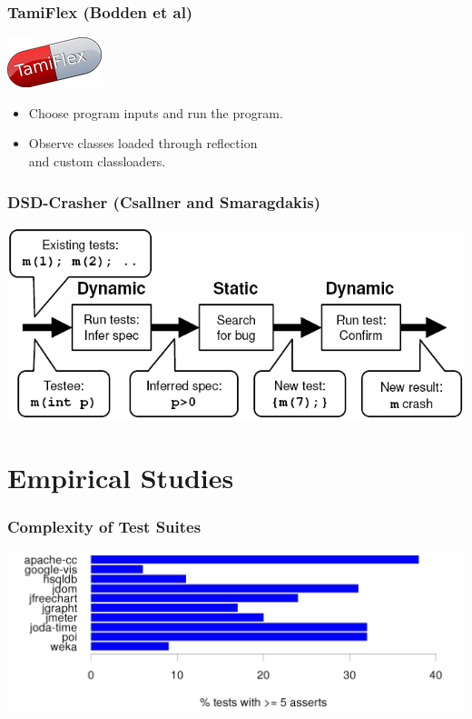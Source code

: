 \documentclass{beamer}
\newenvironment{changemargin}[1]{%
  \begin{list}{}{%
    \setlength{\topsep}{0pt}%
    \setlength{\leftmargin}{#1}%
    \setlength{\rightmargin}{1em}
    \setlength{\listparindent}{\parindent}%
    \setlength{\itemindent}{\parindent}%
    \setlength{\parsep}{\parskip}%
  }%
  \item[]}{\end{list}}
\begin{document}
\begin{frame}
  \frametitle{TamiFlex (Bodden et al)}

\begin{center}
\includegraphics[width=.2\textwidth]{images/tamiflex.png}
\end{center}

\Large
\begin{changemargin}{1cm}
\begin{itemize}
\item Choose program inputs and run the program.
\item Observe classes loaded through reflection \\
 \hspace*{2em} and custom classloaders.
\end{itemize}
\end{changemargin}

\end{frame}

\begin{frame}
  \frametitle{DSD-Crasher (Csallner and Smaragdakis)}

\begin{center}
\includegraphics[width=\textwidth]{images/dsd.png}
\end{center}
\end{frame}

\section{Empirical Studies}

\begin{frame}
  \frametitle{Complexity of Test Suites}
\begin{center}
\includegraphics[width=\textwidth, height=.8\textheight, keepaspectratio=true]{images/five-asserts.png}
\end{center}
\end{frame}
\end{document}
